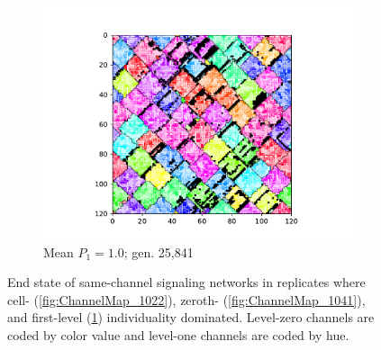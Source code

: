 \begin{figure}[!htbp]
\begin{center}
\begin{subfigure}[b]{0.80\columnwidth}
  \includegraphics[width=\columnwidth,trim={2.5cm 0.5cm 2.5cm 1cm},clip]{img/ChannelMap_1008_update19500000}
  \caption{Mean $P_1 = 1.0$; gen. 25,841}
  \label{fig:ChannelMap_1008}
\end{subfigure}

\caption{
End state of same-channel signaling networks in replicates where cell- (\ref{fig:ChannelMap_1022}), zeroth- (\ref{fig:ChannelMap_1041}), and first-level (\ref{fig:ChannelMap_1008}) individuality dominated.
Level-zero channels are coded by color value and level-one channels are coded by hue.
}
\label{fig:outcome_grids}
\end{center}
\end{figure}
